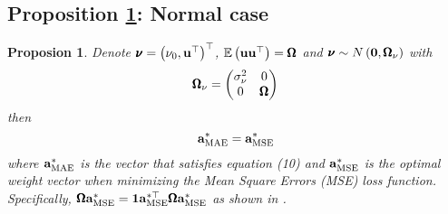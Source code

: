 \documentclass[a4paper, 11pt]{article}
\newtheorem{prop}{Proposion}
\DeclareMathOperator{\MAE}{MAE}
\DeclareMathOperator{\MSE}{MSE}
\begin{document}
\subsection{Proposition \ref{col:optimal_normality}: Normal case}
 
      \begin{prop} \label{col:optimal_normality} 
      Denote $\pmb{\nu} = \left (\nu_0, \mathbf{u}^\top \right )^\top$, $\mathbb{E} \left ( \mathbf{u} \mathbf{u}^\top \right ) = \pmb{\Omega}$ and $\pmb{\nu} \sim N \left ( \mathbf{0}, \pmb{\Omega}_\nu \right )$ with 
      \begin{equation*}
	 \pmb{\Omega}_\nu = \begin{pmatrix} \sigma^2_\nu & 0 \\ 0 & \pmb{\Omega} \end{pmatrix}
      \end{equation*} 
      \noindent then 
	    \begin{equation*} 
	       \bfa^*_{\MAE} = \bfa^*_{\MSE}
	    \end{equation*} 
      \noindent where $\bfa^*_{\MAE}$ is the vector that satisfies equation (10) and $\bfa^*_{\MSE}$ is the optimal weight vector when minimizing the Mean Square Errors (MSE) loss function. Specifically, $\bfOmega \bfa^*_{\MSE} = \bfone \bfa^{*\top}_{\MSE} \bfOmega \bfa^{*}_{\MSE}$ as shown in \cite{ChanPauwels:2018}.   
   \end{prop} 
\end{document}

